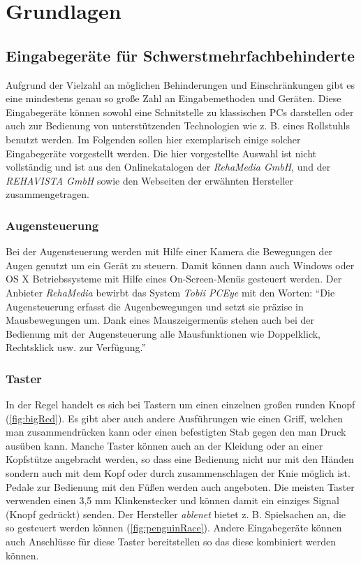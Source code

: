 \section{Grundlagen}

	\subsection{Eingabegeräte für Schwerstmehrfachbehinderte}
    \label{sec:input-devices}
    
    	Aufgrund der Vielzahl an möglichen Behinderungen und Einschränkungen gibt es eine mindestens genau so große Zahl an Eingabemethoden und Geräten. Diese Eingabegeräte können sowohl eine Schnitstelle zu klassischen PCs darstellen oder auch zur Bedienung von unterstützenden Technologien wie z. B. eines Rollstuhls benutzt werden. Im Folgenden sollen hier exemplarisch einige solcher Eingabegeräte vorgestellt werden. Die hier vorgestellte Auswahl ist nicht vollständig und ist aus den Onlinekatalogen der \emph{RehaMedia GmbH}, und der \emph{REHAVISTA GmbH} sowie den Webseiten der erwähnten Hersteller zusammengetragen.
        
        \subsubsection*{Augensteuerung}
        	Bei der Augensteuerung werden mit Hilfe einer Kamera die Bewegungen der Augen genutzt um ein Gerät zu steuern. Damit können dann auch Windows oder OS X Betriebssysteme mit Hilfe eines On-Screen-Menüs gesteuert werden. Der Anbieter \emph{RehaMedia} bewirbt das System \emph{Tobii PCEye} mit den Worten: \enquote{Die Augensteuerung erfasst die Augenbewegungen und setzt sie präzise in Mausbewegungen um. Dank eines Mauszeigermenüs stehen auch bei der Bedienung mit der Augensteuerung alle Mausfunktionen wie Doppelklick, Rechtsklick usw. zur Verfügung.} \parencite{rehamedia:TobiiPCEyeGo}
            
         \subsubsection*{Taster}
         	In der Regel handelt es sich bei Tastern um einen einzelnen großen runden Knopf (\autoref{fig:bigRed}). Es gibt aber auch andere Ausführungen wie einen Griff, welchen man zusammendrücken kann oder einen befestigten Stab gegen den man Druck ausüben kann. Manche Taster können auch an der Kleidung oder an einer Kopfstütze angebracht werden, so dass eine Bedienung nicht nur mit den Händen sondern auch mit dem Kopf oder durch zusammenschlagen der Knie möglich ist. Pedale zur Bedienung mit den Füßen werden auch angeboten. Die meisten Taster verwenden einen 3,5 mm Klinkenstecker und können damit ein einziges Signal (Knopf gedrückt) senden. Der Hersteller \emph{ablenet} bietet z. B. Spielsachen an, die so gesteuert werden können (\autoref{fig:penguinRace}). Andere Eingabegeräte können auch Anschlüsse für diese Taster bereitstellen so das diese kombiniert werden können.  
         	
